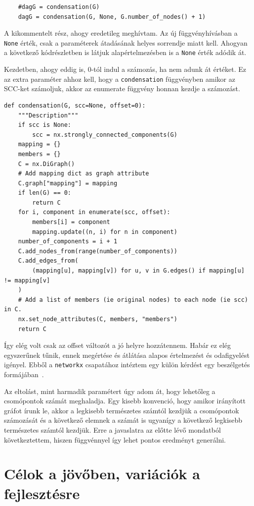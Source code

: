 \documentclass[
]{thesis-ekf}
\theoremstyle{definition}
\theoremstyle{remark}
\begin{document}
\begin{lstlisting}
	#dagG = condensation(G)
	dagG = condensation(G, None, G.number_of_nodes() + 1)
\end{lstlisting}

	A kikommentelt rész, ahogy eredetileg meghívtam. Az új függvényhívásban a \texttt{None} érték, csak a paraméterek átadásának helyes sorrendje miatt kell. Ahogyan a következő kódrészletben is látjuk alapértelmezésben is a \texttt{None} érték adódik át.

	Kezdetben, ahogy eddig is, 0-tól indul a számozás, ha nem adunk át értéket. Ez az extra paraméter ahhoz kell, hogy a \texttt{condensation} függvényben amikor az \textsc{SCC}-ket számoljuk, akkor az enumerate függvény honnan kezdje a számozást.

\begin{lstlisting}
def condensation(G, scc=None, offset=0):
	"""Description"""
	if scc is None:
		scc = nx.strongly_connected_components(G)
	mapping = {}
	members = {}
	C = nx.DiGraph()
	# Add mapping dict as graph attribute
	C.graph["mapping"] = mapping
	if len(G) == 0:
		return C
	for i, component in enumerate(scc, offset):
		members[i] = component
		mapping.update((n, i) for n in component)
	number_of_components = i + 1
	C.add_nodes_from(range(number_of_components))
	C.add_edges_from(
		(mapping[u], mapping[v]) for u, v in G.edges() if mapping[u] != mapping[v]
	)
	# Add a list of members (ie original nodes) to each node (ie scc) in C.
	nx.set_node_attributes(C, members, "members")
	return C	
\end{lstlisting}

	Így elég volt csak az offset változót a jó helyre hozzátennem. Habár ez elég egyszerűnek tűnik, ennek megértése és átlátása alapos értelmezést és odafigyelést igényel. Ebből a \texttt{networkx} csapatához intéztem egy külön kérdést egy beszélgetés formájában~\cite{git-issue-for-offset}.

	Az eltolást, mint harmadik paramétert úgy adom át, hogy lehetőleg a csomópontok számát meghaladja. Egy kisebb konvenció, hogy amikor irányított gráfot írunk le, akkor a legkisebb természetes számtól kezdjük a csomópontok számozását és a következő elemnek a számát is ugyanígy a következő legkisebb természetes számtól kezdjük. Erre a javaslatra az előtte lévő mondatból következtettem, hiszen függvénnyel így lehet pontos eredményt generálni.

	\section{Célok a jövőben, variációk a fejlesztésre}
	
\end{document}
